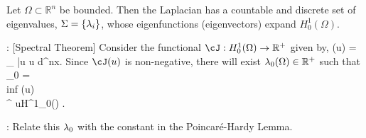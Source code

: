Let $\Omega \subset \mathbb{R}^n$ be bounded. 
Then the Laplacian has a countable and discrete set of eigenvalues,
$\Sigma=\{\mbox{$\lambda$}_i\}$,
whose eigenfunctions (eigenvectors) expand $H^1_0(\Omega)$.
\eteo



\pru: [Spectral Theorem]
Consider the functional
${\cJ}:H^1_0(\Omega) \rightarrow \mathbb{R}^+$ given by,
\beq
\mbox{\cJ}(u) = 
{\int_{\Omega} \bar u u \:d^nx}.
\eeq
Since $\cJ (u)$ is non-negative, there will exist $\mbox{$\lambda$}_0(\Omega) \in \mathbb{R}^+$ such that 
\beq 
\lam_0 =  \\ inf \cJ (u) \\^{
       u\in H^1_0(\Omega)} \earr.
\eeq

\ejer: 
Relate this $\mbox{$\lambda$}_0$ with the constant in the
Poincaré-Hardy Lemma. 
\espa

